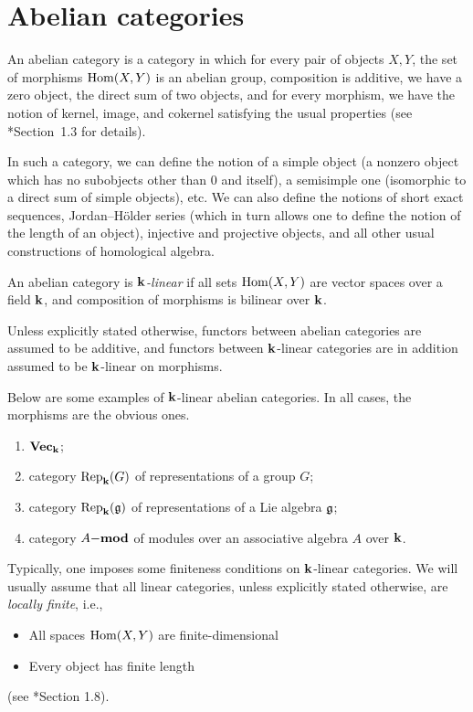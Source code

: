 \section{Abelian categories}\label{s:abelian}
\begin{definition}\label{d:abelian}
  An abelian category is a category in which for every pair of objects $X,Y$,
  the set of morphisms $\Hom(X,Y)$ is an abelian group, composition is
  additive, we have a zero object, the direct sum of two objects, and for every
  morphism, we have the notion of kernel, image, and cokernel satisfying the
  usual properties (see *{Section~1.3} for details).
\end{definition}
In such a category, we can define the notion of a simple object (a nonzero
object which has no subobjects other than $0$ and itself), a semisimple one
(isomorphic to a direct sum of simple objects), etc. We can also define the
notions of short exact sequences, Jordan--H\"older series (which in turn allows
one to define the notion of the length of an object), injective and projective
objects, and all other usual constructions of homological algebra.

An abelian category is
\emph{$\kk$-linear} if all sets
$\Hom(X,Y)$ are vector spaces over a field $\kk$, and composition of morphisms
is bilinear over $\kk$.

Unless explicitly stated otherwise, functors between abelian categories are
assumed to be additive, and functors between $\kk$-linear categories are in
addition assumed to be $\kk$-linear on morphisms.


\begin{example}\label{x:linear-abelian-cats}
  Below are some examples of $\kk$-linear abelian categories. In all cases,
  the morphisms are the obvious ones.
  \begin{enumerate}
    \item $\vect_\kk$;
    \item category $\Rep_\kk(G)$ of representations of a group $G$;
    \item category $\Rep_\kk(\g)$ of representations of a Lie algebra $\g$;
    \item category $A\mod$ of modules over an associative algebra $A$
      over $\kk$.
  \end{enumerate}
\end{example}

Typically, one imposes some finiteness conditions on $\kk$-linear
categories. We will usually assume that all linear categories, unless
explicitly stated otherwise, are
\emph{locally finite}, i.e.,
\begin{itemize}
  \item All spaces $\Hom(X,Y)$ are finite-dimensional
  \item Every object has finite length
\end{itemize}
(see *{Section 1.8}).

